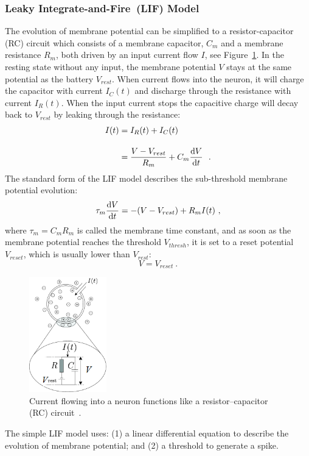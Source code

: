 \subsubsection{Leaky Integrate-and-Fire~(LIF) Model}
The evolution of membrane potential can be simplified to a resistor-capacitor (RC) circuit which consists of a membrane capacitor, $C_m$ and a membrane resistance $R_m$, both driven by an input current flow $I$, see Figure~\ref{Fig:rc}.
In the resting state without any input, the membrane potential $V$ stays at the same potential as the battery $V_{rest}$.
When current flows into the neuron, it will charge the capacitor with current $I_C(t)$ and discharge through the resistance with current $I_R(t)$.
When the input current stops the capacitive charge will decay back to $V_{rest}$ by leaking through the resistance:
\begin{equation}
\begin{aligned}
	I(t) &= I_R(t) + I_C(t) \\[10pt]
	&= \dfrac{V-V_{rest}}{R_m} + C_m \dfrac{\mathrm{d} V}{\mathrm{d} t}~~.
\end{aligned}
\label{equ:LIF_current}
\end{equation}
The standard form of the LIF model describes the sub-threshold membrane potential evolution:
\begin{equation}
	\tau_m \dfrac{\mathrm{d} V}{\mathrm{d} t} = -(V-V_{rest}) + R_m I(t)~,
\end{equation}
where $\tau_m = C_m R_m$ is called the membrane time constant, and as soon as the membrane potential reaches the threshold $V_{thresh}$, it is set to a reset potential $V_{reset}$, which is usually lower than $V_{rest}$: 
\begin{equation}
V = V_{reset}~.
\end{equation}

\begin{figure}[tb!]
	\centering
	\includegraphics[width=0.3\textwidth]{pics_snn/RC.png}
	\caption{Current flowing into a neuron functions like a resistor–capacitor (RC) circuit~\citep{gerstner2014neuronal}.}
	\label{Fig:rc}
\end{figure}
The simple LIF model uses: (1) a linear differential equation to describe the evolution of membrane potential;
and (2) a threshold to generate a spike.

